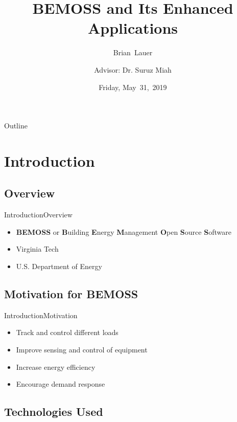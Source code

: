 \documentclass{beamer}
\title[BEMOSS]{BEMOSS and Its Enhanced Applications}
\author[B.~Lauer]{Brian~Lauer\\\and
Advisor: Dr. Suruz Miah}
\institute[Bradley University] %
{
  Department of Electrical and Computer Engineering\\
  Bradley University\\
  1501 W. Bradley Avenue\\
  Peoria, IL, 61625, USA
}
\date[May~31,~2019]{Friday, May~31,~2019}
\begin{document}
\begin{frame}
  \titlepage
\end{frame}

\begin{frame}{Outline}
  \tableofcontents
\end{frame}

\section{Introduction}

\subsection{Overview}

\begin{frame}{Introduction}{Overview}
	\begin{itemize}
		\item \textbf{BEMOSS} or \textbf{B}uilding \textbf{E}nergy \textbf{M}anagement \textbf{O}pen \textbf{S}ource \textbf{S}oftware
		\item Virginia Tech 
		\item U.S. Department of Energy 
	\end{itemize}    
\end{frame}


\subsection{Motivation for BEMOSS} 

\begin{frame}{Introduction}{Motivation}
	\begin{itemize}
		\item Track and control different loads
		\item Improve sensing and control of equipment
		\item Increase energy efficiency
		\item Encourage demand response
	\end{itemize}
\end{frame}

\subsection{Technologies Used}
\end{document}
